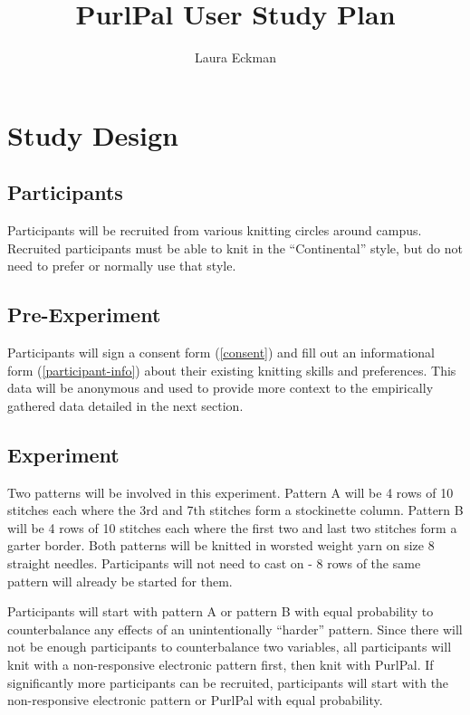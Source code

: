 \documentclass{article}
\begin{document}
\title{PurlPal User Study Plan}
\author{Laura Eckman}
\maketitle

\section{Study Design}

\subsection{Participants}

Participants will be recruited from various knitting circles around campus.
Recruited participants must be able to knit in the ``Continental'' style, but do not need to prefer or normally use that style.

\subsection{Pre-Experiment}

Participants will sign a consent form (\ref{consent}) and fill out an informational form (\ref{participant-info}) about their existing knitting skills and preferences.
This data will be anonymous and used to provide more context to the empirically gathered data detailed in the next section.

\subsection{Experiment}

Two patterns will be involved in this experiment.
Pattern A will be 4 rows of 10 stitches each where the 3rd and 7th stitches form a stockinette column.
Pattern B will be 4 rows of 10 stitches each where the first two and last two stitches form a garter border.
Both patterns will be knitted in worsted weight yarn on size 8 straight needles.
Participants will not need to cast on - 8 rows of the same pattern will already be started for them.

Participants will start with pattern A or pattern B with equal probability to counterbalance any effects of an unintentionally ``harder'' pattern.
Since there will not be enough participants to counterbalance two variables, all participants will knit with a non-responsive electronic pattern first, then knit with PurlPal.
If significantly more participants can be recruited, participants will start with the non-responsive electronic pattern or PurlPal with equal probability.
\end{document}
